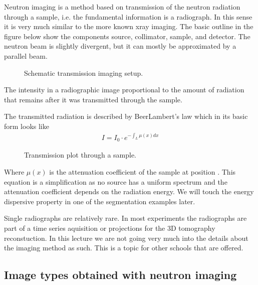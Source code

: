 \documentclass[letterpaper,10pt,english]{sphinxmanual}
\begin{document}
Neutron imaging is a method based on transmission of the neutron radiation through a sample, i.e. the fundamental information is a radiograph. In this sense it is very much similar to the more known x\sphinxhyphen{}ray imaging. The basic outline in the figure below show the components source, collimator, sample, and detector. The neutron beam is slightly divergent, but it can mostly be approximated by a parallel beam.

\begin{figure}[htbp]
\centering
\capstart

\noindent{}
\caption{Schematic transmission imaging setup.}\label{\detokenize{ML4NeutronImageSegmentation:id3}}\end{figure}

The intensity in a radiographic image proportional to the amount of radiation that remains after it was transmitted through the sample.

The transmitted radiation is described by Beer\sphinxhyphen{}Lambert’s law which in its basic form looks like
\begin{equation*}
\begin{split}I=I_0\cdot{}e^{-\int_L \mu{}(x) dx}\end{split}
\end{equation*}
\begin{figure}[htbp]
\centering
\capstart

\noindent{}
\caption{Transmission plot through a sample.}\label{\detokenize{ML4NeutronImageSegmentation:id4}}\end{figure}

Where \(\mu(x)\) is the attenuation coefficient of the sample at position . This equation is a simplification as no source has a uniform spectrum and the attenuation coefficient depends on the radiation energy. We will touch the energy dispersive property in one of the segmentation examples later.

Single radiographs are relatively rare. In most experiments the radiographs are part of a time series aquisition or projections for the 3D tomography reconstuction. In this lecture we are not going very much into the details about the imaging method as such. This is a topic for other schools that are offered.


\subsection{Image types obtained with neutron imaging}
\label{\detokenize{ML4NeutronImageSegmentation:image-types-obtained-with-neutron-imaging}}
\end{document}
